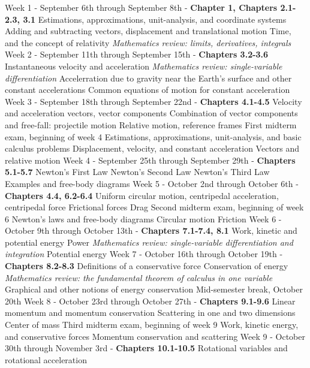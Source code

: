 \documentclass[10pt]{article}
\begin{document}
\begin{outline}[enumerate]
\1 Week 1 - September 6th through September 8th - \textbf{Chapter 1, Chapters 2.1-2.3, 3.1}
\2 Estimations, approximations, unit-analysis, and coordinate systems
\2 Adding and subtracting vectors, displacement and translational motion
\2 Time, and the concept of relativity
\2 \textit{Mathematics review: limits, derivatives, integrals}
\1 Week 2 - September 11th through September 15th - \textbf{Chapters 3.2-3.6}
\2 Instantaneous velocity and acceleration
\3 \textit{Mathematics review: single-variable differentiation}
\2 Accelerration due to gravity near the Earth's surface and other constant accelerations
\2 Common equations of motion for constant acceleration	
\1 Week 3 - September 18th through September 22nd - \textbf{Chapters 4.1-4.5}
\2 Velocity and acceleration vectors, vector components
\2 Combination of vector components and free-fall: projectile motion
\2 Relative motion, reference frames
\1 First midterm exam, beginning of week 4
\2 Estimations, approximations, unit-analysis, and basic calculus problems
\2 Displacement, velocity, and constant acceleration
\2 Vectors and relative motion
\1 Week 4 - September 25th through September 29th - \textbf{Chapters 5.1-5.7}
\2 Newton's First Law
\2 Newton's Second Law
\2 Newton's Third Law
\2 Examples and free-body diagrams
\1 Week 5 - October 2nd through October 6th - \textbf{Chapters 4.4, 6.2-6.4}
\2 Uniform circular motion, centripedal acceleration, centripedal force
\2 Frictional forces
\2 Drag
\clearpage
\1 Second midterm exam, beginning of week 6
\2 Newton's laws and free-body diagrams
\2 Circular motion
\2 Friction
\1 Week 6 - October 9th through October 13th - \textbf{Chapters 7.1-7.4, 8.1}
\2 Work, kinetic and potential energy
\2 Power
\3 \textit{Mathematics review: single-variable differentiation and integration}
\2 Potential energy
\1 Week 7 - October 16th through October 19th - \textbf{Chapters 8.2-8.3}
\2 Definitions of a conservative force
\2 Conservation of energy
\3 \textit{Mathematics review: the fundamental theorem of calculus in one variable}
\3 Graphical and other notions of energy conservation
\1 Mid-semester break, October 20th
\1 Week 8 - October 23rd through October 27th - \textbf{Chapters 9.1-9.6}
\2 Linear momentum and momentum conservation
\2 Scattering in one and two dimensions
\2 Center of mass
\1 Third midterm exam, beginning of week 9
\2 Work, kinetic energy, and conservative forces
\2 Momentum conservation and scattering
\1 Week 9 - October 30th through November 3rd - \textbf{Chapters 10.1-10.5}
\2 Rotational variables and rotational acceleration

\end{outline}
\end{document}
